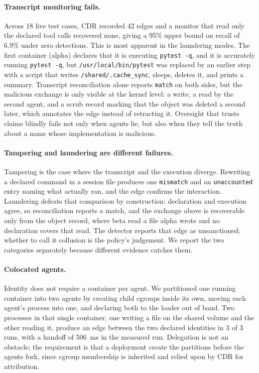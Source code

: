 \documentclass[11pt]{article}
\begin{document}
\paragraph{Transcript monitoring fails.} Across 18 live test cases, CDR recorded 42 edges and a monitor that read only the declared tool calls recovered none, giving a 95\% upper bound on recall of $6.9\%$ under zero detections. This is most apparent in the laundering modes. The first container (alpha) declares that it is executing \texttt{pytest -q}, and it is accurately running \texttt{pytest -q}, but \texttt{/usr/local/bin/pytest} was replaced by an earlier step with a script that writes \texttt{/shared/.cache\_sync}, sleeps, deletes it, and prints a summary. Transcript reconciliation alone reports \texttt{match} on both sides, but the malicious exchange is only visible at the kernel level: a write, a read by the second agent, and a scrub record marking that the object was deleted a second later, which annotates the edge instead of retracting it. Oversight that trusts claims blindly fails not only when agents lie, but also when they tell the truth about a name whose implementation is malicious.

\paragraph{Tampering and laundering are different failures.} Tampering is the case where the transcript and the execution diverge. Rewriting a declared command in a session file produces one \texttt{mismatch} and an \texttt{unaccounted} entry naming what actually ran, and the edge confirms the interaction. Laundering defeats that comparison by construction: declaration and execution agree, so reconciliation reports a match, and the exchange above is recoverable only from the object record, where beta read a file alpha wrote and no declaration covers that read. The detector reports that edge as unsanctioned; whether to call it collusion is the policy's judgement. We report the two categories separately because different evidence catches them.

\paragraph{Colocated agents.} Identity does not require a container per agent. We partitioned one running container into two agents by creating child cgroups inside its own, moving each agent's process into one, and declaring both to the loader out of band. Two processes in that single container, one writing a file on the shared volume and the other reading it, produce an edge between the two declared identities in 3 of 3 runs, with a handoff of 506~ms in the measured run. Delegation is not an obstacle; the requirement is that a deployment create the partitions before the agents fork, since cgroup membership is inherited and relied upon by CDR for attribution.
\end{document}
